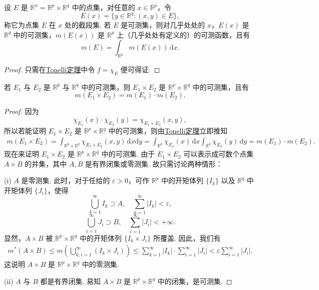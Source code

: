 \documentclass[../../main.tex]{subfiles}%
\begin{document}
\begin{theorem}
设 \( E \) 是 \( \mathbb{R}^n = \mathbb{R}^p \times \mathbb{R}^q \) 中的点集，对任意的 \( x \in \mathbb{R}^p \)，令
\[
E(x) = \{ y \in \mathbb{R}^q : (x, y) \in E \},
\]
称它为点集 \( E \) 在 \( x \) 处的截段集. 若 \( E \) 是可测集，则对几乎处处的 \( x \)，\( E(x) \) 是 \( \mathbb{R}^q \) 中的可测集，\( m(E(x)) \) 是 \( \mathbb{R}^p \) 上（几乎处处有定义的）的可测函数，且有
\[
m(E) = \int_{\mathbb{R}^p} m(E(x)) \, \mathrm{d}x.
\]
\end{theorem}
\begin{proof}
只需在\hyperref[theorem:Tonelli定理(非负可测函数的情形)]{Tonelli定理}中令 \( f = \chi_E \) 便可得证.
\end{proof}

\begin{theorem}
若 \( E_1 \) 与 \( E_2 \) 是 \( \mathbb{R}^p \) 与 \( \mathbb{R}^q \) 中的可测集，则 \( E_1 \times E_2 \) 是 \( \mathbb{R}^p \times \mathbb{R}^q \) 中的可测集，且有
\[
m(E_1 \times E_2) = m(E_1) \cdot m(E_2).
\]
\end{theorem}
\begin{proof}
因为
\[
\chi_{E_1}(x) \cdot \chi_{E_2}(y) = \chi_{E_1 \times E_2}(x, y),
\]
所以若能证明 \( E_1 \times E_2 \) 是 \( \mathbb{R}^p \times \mathbb{R}^q \) 中的可测集，则由\hyperref[theorem:Tonelli定理(非负可测函数的情形)]{Tonelli定理}立即推知
\begin{align*}
m(E_1 \times E_2) = \int_{\mathbb{R}^p \times \mathbb{R}^q} \chi_{E_1 \times E_2}(x, y) \, \mathrm{d}x\mathrm{d}y 
= \int_{\mathbb{R}^p} \chi_{E_1}(x) \, \mathrm{d}x \int_{\mathbb{R}^q} \chi_{E_2}(y) \, \mathrm{d}y = m(E_1) \cdot m(E_2).
\end{align*}
现在来证明 \( E_1 \times E_2 \) 是 \( \mathbb{R}^p \times \mathbb{R}^q \) 中的可测集. 由于 \( E_1 \times E_2 \) 可以表示成可数个点集 \( A \times B \) 的并集，其中 \( A, B \) 是有界闭集或零测集. 故只需讨论两种情形：

(i) \( A \) 是零测集. 此时，对于任给的 \( \varepsilon > 0 \)，可作 \( \mathbb{R}^p \) 中的开矩体列 \( \{ I_k \} \) 以及 \( \mathbb{R}^q \) 中开矩体列 \( \{ J_i \} \)，使得
\[
\bigcup_{k = 1}^{\infty} I_k \supset A, \quad \sum_{k = 1}^{\infty} |I_k| < \varepsilon,
\]
\[
\bigcup_{i = 1}^{\infty} J_i \supset B, \quad \sum_{i = 1}^{\infty} |J_i| < +\infty.
\]
显然，\( A \times B \) 被 \( \mathbb{R}^p \times \mathbb{R}^q \) 中的开矩体列 \( \{ I_k \times J_i \} \) 所覆盖. 因此，我们有
\begin{align*}
m^*(A \times B) \leqslant m\left( \bigcup_{k, i = 1}^{\infty} (I_k \times J_i) \right) 
\leqslant \sum_{k = 1}^{\infty} |I_k| \cdot \sum_{i = 1}^{\infty} |J_i| < \varepsilon \sum_{i = 1}^{\infty} |J_i|.
\end{align*}
这说明 \( A \times B \) 是 \( \mathbb{R}^p \times \mathbb{R}^q \) 中的零测集.

(ii) \( A \) 与 \( B \) 都是有界闭集. 易知 \( A \times B \) 是 \( \mathbb{R}^p \times \mathbb{R}^q \) 中的闭集，是可测集.
\end{proof}
\end{document}
